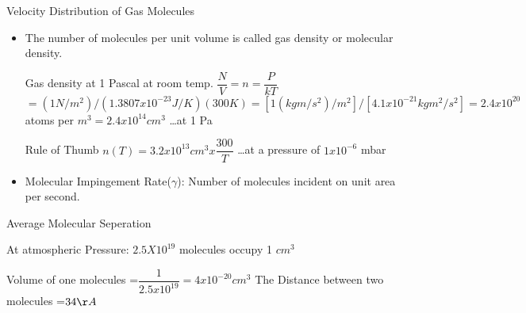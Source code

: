 \documentclass[11]{beamer}
\begin{document}
\begin{frame}{Velocity Distribution of Gas Molecules}


	\begin{exampleblock}

       \begin{itemize}
      	 \item The number of molecules per unit volume is called gas density or molecular density. \break
      	 
		Gas density at 1 Pascal at room temp. \break
		$ \dfrac{N}{V} = n =\dfrac{P}{kT} $ 
		$= (1 N/m^{2})/(1.3807x10^{-23} J/K)(300 K)
		= [1 (kg m/s^{2})/m^{2}]/[4.1x10^{-21} kg m^{2}/s^{2}]
		= 2.4x10^{20}$ atoms per $m^{3}
		= 2.4x10^{14} cm^{3} $	…at 1 Pa \break

        Rule of Thumb   $ n(T) = 3.2x10^{13} cm^{3} x \dfrac{300}{T} $ …at a pressure of $1x10^{-6}$ mbar \break
     	 \item Molecular Impingement Rate($ \gamma $): Number of molecules incident on unit area per second.       
       
       \end{itemize}


	\end{exampleblock}









\end{frame}



\begin{frame}{Average Molecular Seperation}


At atmospheric  Pressure:
$2.5X10^{19}$ molecules occupy 1 $cm^3$ \break

Volume of one molecules =$\dfrac{1}{2.5x10^{19}} =4x10^{-20} cm^{3}$ \break
The Distance between two molecules =$34 \AA $	

\begin{center}



\end{center}








\end{frame}
\end{document}
